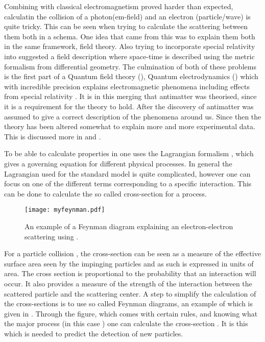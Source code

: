 Combining \abbrQM with classical electromagnetism proved harder than expected, calculatin the collision of a photon(em-field) and an electron (particle/wave) is quite tricky. This can be seen when trying to calculate the scattering between them both in a \abbrQM schema. One idea that came from this was to explain them both in the same framework, field theory. Also trying to incorporate special relativity into \abbrQM suggested a field description where space-time is described using the metric formalism from differential geometry.
The culmination of both of these problems is the first part of a Quantum field theory (\abbrQFT), Quantum electrodynamics (\abbrQED) which with incredible precision explains electromagnetic phenomena including effects from special relativity \citep{Zee:2003}. It is in this merging that antimatter was theorised, since it is a requirement for the theory to hold. After the discovery of antimatter \abbrQED was assumed to give a correct description of the phenomena around us. Since then the theory has been altered somewhat to explain more and more experimental data. This is discussed more in  and .

To be able to calculate properties in \abbrQFT one uses the Lagrangian formalism \citep{Goldstein:2001}, which gives a governing equation for different physical processes. In general the Lagrangian used for the standard model is quite complicated, however one can focus on one of the different terms corresponding to a specific interaction. This can be done to calculate the so called cross-section for a process. 

\begin{SCfigure}[][h]
 \centering
 \texttt{[image: myfeynman.pdf]}
  \caption{{\small An example of a Feynman diagram explaining an electron-electron scattering using \abbrQED.}}
    \label{fig:exFeynman}
\end{SCfigure}

For a particle collision \citep{Herr:2006}, the cross-section can be seen as a measure of the effective surface area seen by the impinging particles and as such is expressed in units of area. The cross section is proportional to the probability that an interaction will occur. It also provides a measure of the strength of the interaction between the scattered particle and the scattering center. A step to simplify the calculation of the cross-sections is to use so called Feynman diagrams, an example of which is given in . Through the figure, which comes with certain rules, and knowing what the major process (in this case \abbrQED) one can calculate the cross-section \citep{Zee:2003,Herr:2006}. It is this which is needed to predict the detection of new particles. 

